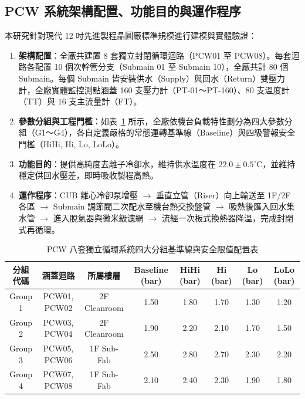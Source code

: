 \documentclass[fontset=none, a4paper, 12pt]{ctexart}
\begin{document}
\begin{doublespace}
\subsection{PCW 系統架構配置、功能目的與運作程序}
本研究針對現代 12 吋先進製程晶圓廠標準規模進行建模與實體驗證：
\begin{enumerate}
    \item \textbf{架構配置}：全廠共建置 8 套獨立封閉循環迴路（PCW01 至 PCW08）。每套迴路各配置 10 個次幹管分支（Submain 01 至 Submain 10），全廠共計 80 個 Submain。每個 Submain 皆安裝供水（Supply）與回水（Return）雙壓力計，全廠實體監控測點涵蓋 160 支壓力計（PT-01～PT-160）、80 支溫度計（TT）與 16 支主流量計（FT）。
    \item \textbf{參數分組與工程門檻}：如表~\ref{tab:pcw_groups} 所示，全廠依機台負載特性劃分為四大參數分組（G1～G4），各自定義嚴格的常態運轉基準線（Baseline）與四級警報安全門檻（HiHi, Hi, Lo, LoLo）。
    \item \textbf{功能目的}：提供高純度去離子冷卻水，維持供水溫度在 $22.0 \pm 0.5^\circ\mathrm{C}$，並維持穩定供回水壓差，即時吸收製程高熱。
    \item \textbf{運作程序}：CUB 離心冷卻泵增壓 $\to$ 垂直立管（Riser）向上輸送至 1F/2F 各區 $\to$ Submain 調節閥二次配水至機台熱交換盤管 $\to$ 吸熱後匯入回水集水管 $\to$ 進入脫氣器與微米級濾網 $\to$ 流經一次板式換熱器降溫，完成封閉式再循環。
\end{enumerate}

\begin{table}[H]
\centering
\caption{PCW 八套獨立循環系統四大分組基準線與安全限值配置表}
\label{tab:pcw_groups}
\footnotesize
\renewcommand{\arraystretch}{1.15}
\setlength{\tabcolsep}{6pt}
\begin{tabularx}{0.96\textwidth}{cccccccc}
\toprule
\textbf{分組代碼} & \textbf{涵蓋迴路} & \textbf{所屬樓層} & \textbf{Baseline (bar)} & \textbf{HiHi (bar)} & \textbf{Hi (bar)} & \textbf{Lo (bar)} & \textbf{LoLo (bar)} \\
\midrule
Group 1 & PCW01, PCW02 & 2F Cleanroom & 1.50 & 1.80 & 1.70 & 1.30 & 1.20 \\
Group 2 & PCW03, PCW04 & 2F Cleanroom & 1.90 & 2.20 & 2.10 & 1.70 & 1.50 \\
Group 3 & PCW05, PCW06 & 1F Sub-Fab   & 2.50 & 2.80 & 2.70 & 2.30 & 2.20 \\
Group 4 & PCW07, PCW08 & 1F Sub-Fab   & 2.10 & 2.40 & 2.30 & 1.90 & 1.80 \\
\bottomrule
\end{tabularx}
\end{table}


\end{doublespace}
\end{document}
